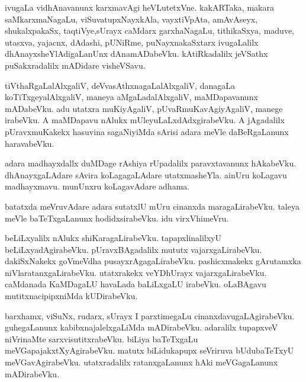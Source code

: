 \documentclass{article}
\begin{document}
\begin{mn}
ivugaLa  vidhAnavanunx  karxmavAgi  heVLutetxVne.  kakARTaka,  makara saMkarxmaNagaLu,  viSuvatupxNayxkAla,  
vayxtiVpAta,  amAvAseyx,  shukalxpakaSx,  taqtiVye,sUrayx caMdarx garxhaNagaLu,  tithikaSxya,  maduve,  
utasxva,  yajacnx,  dAdashi,  pUNiRme,  puNayxnakaSxtarx   ivugaLalilx  dhAnayxsheYlAdigaLanUnx  
dAnamADabeVku.  kAtiRkadalilx  jeVSathx puSakxradalilx  mADidare  visheVSavu.
\end{mn}

\begin{mn}
tiVthaRgaLalAlxgaliV,  deVvasAthxnagaLalAlxgaliV,  danagaLa  koTiTxgeyalAlxgaliV,  maneya  
aMgaLadalAlxgaliV,  maMDapavanunx  mADabeVku.  adu  utatxra muKiyAgaliV,  pUvaRmuKavAgiyAgaliV,  
manege  irabeVku.  A  maMDapavu  nAlukx  mUleyuLaLxdAdxgirabeVku.  A  jAgadalilx  pUravxmuKakekx  
hasuvina  sagaNiyiMda  sArisi  adara  meVle  daBeRgaLanunx  haravabeVku.  
\end{mn}

\begin{mn}
adara  madhayxdallx  duMDage  rAshiya  rUpadalilx  paravxtavanunx  hAkabeVku.  dhAnayxgaLAdare  
sAvira  koLagagaLAdare  utatxmasheYla.  ainUru  koLagavu  madhayxmavu.  munUnxru  koLagavAdare  adhama.  
\end{mn}

\begin{mn}
batatxda  meVruvAdare  adara  sutatxlU  mUru  cinanxda  maragaLirabeVku.  taleya  meVle  
baTeTxgaLanunx  hodidxsirabeVku.  idu  virxVhimeVru.
\end{mn}

\begin{mn}
beLiLxyalilx  nAlukx  shiKaragaLirabeVku.  tapapxlinalilxyU  beLiLxyadAgirabeVku.  
pUravxBAgadalilx  mututx vajarxgaLirabeVku.  dakiSxNakekx  goVmeVdha  pusayxrAgagaLirabeVku.  
pashicxmakekx  gArutamxka  niVlaratanxgaLirabeVku.  utatxrakekx  veYDhUrayx  vajarxgaLirabeVku.  
caMdanada  KaMDagaLU  havaLada  baLiLxgaLU  irabeVku.  oLaBAgavu  mutitxnacipipxniMda  kUDirabeVku.
\end{mn}

\begin{mn}
barxhamx,  viSuNx,  rudarx,  sUrayx  I  parxtimegaLu  cinanxdavugaLAgirabeVku.  guhegaLanunx  
kabibxnajalelxgaLiMda  mADirabeVku.  adaralilx  tupapxveV  niVrinaMte  sarxvisutitxrabeVku.  
biLiya  baTeTxgaLu  meVGapajakxtXyAgirabeVku.  matutx  biLidukapupx  seVriruva  bUdubaTeTxyU  
meVGavAgirabeVku.  utatxradalilx  ratanxgaLanunx  hAki  meVGagaLanunx  mADirabeVku.
\end{mn}
\end{document}
